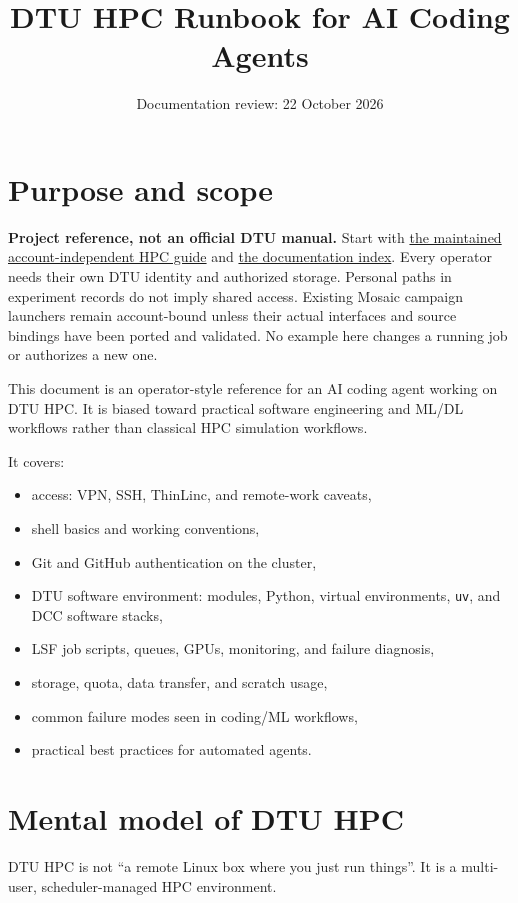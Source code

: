 \documentclass[11pt,a4paper]{article}
\title{\textbf{DTU HPC Runbook for AI Coding Agents}}
\author{}
\date{Documentation review: 22 October 2026}
\begin{document}
\maketitle
\tableofcontents
\newpage

\section{Purpose and scope}

\textbf{Project reference, not an official DTU manual.} Start with
\href{HPC_GUIDE.md}{the maintained account-independent HPC guide} and
\href{README.md}{the documentation index}. Every operator needs their own
DTU identity and authorized storage. Personal paths in experiment records do
not imply shared access. Existing Mosaic campaign launchers remain account-bound
unless their actual interfaces and source bindings have been ported and validated.
No example here changes a running job or authorizes a new one.

This document is an operator-style reference for an AI coding agent working on DTU HPC. It is biased toward practical software engineering and ML/DL workflows rather than classical HPC simulation workflows.

It covers:

\begin{itemize}[leftmargin=1.5em]
  \item access: VPN, SSH, ThinLinc, and remote-work caveats,
  \item shell basics and working conventions,
  \item Git and GitHub authentication on the cluster,
  \item DTU software environment: modules, Python, virtual environments, \texttt{uv}, and DCC software stacks,
  \item LSF job scripts, queues, GPUs, monitoring, and failure diagnosis,
  \item storage, quota, data transfer, and scratch usage,
  \item common failure modes seen in coding/ML workflows,
  \item practical best practices for automated agents.
\end{itemize}

\section{Mental model of DTU HPC}

DTU HPC is not ``a remote Linux box where you just run things''. It is a multi-user, scheduler-managed HPC environment.
\end{document}
